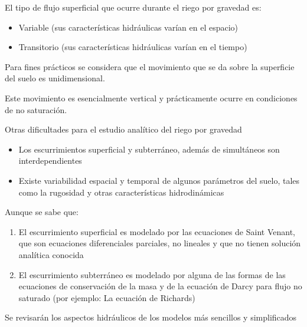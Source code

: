 \begin{definition}
    El tipo de flujo superficial que ocurre durante
el riego por gravedad es:
\begin{itemize}
    \item Variable (sus características hidráulicas varían en el espacio)
    \item Transitorio (sus características hidráulicas varían en el tiempo)
\end{itemize}
Para fines prácticos se considera que el
movimiento que se da sobre la superficie
del suelo es unidimensional.
\end{definition}


\begin{definition}
    Este movimiento es esencialmente vertical y prácticamente ocurre en condiciones de no saturación.
\end{definition}

Otras dificultades para el estudio analítico del riego por gravedad
\begin{itemize}
    \item Los escurrimientos superficial y subterráneo, además de simultáneos son interdependientes
    \item Existe variabilidad espacial y temporal de algunos parámetros del suelo, tales como la rugosidad y otras características hidrodinámicas
\end{itemize}
Aunque se sabe que:
\begin{enumerate}
    \item El escurrimiento superficial es modelado por las ecuaciones de Saint Venant, que son ecuaciones diferenciales parciales, no lineales y que no tienen solución analítica conocida
    \item El escurrimiento subterráneo es modelado por alguna de las formas de las ecuaciones de conservación de la masa y de la ecuación de Darcy para flujo no saturado (por ejemplo: La ecuación de Richards)
\end{enumerate}
Se revisarán los aspectos hidráulicos de los modelos más sencillos y simplificados

